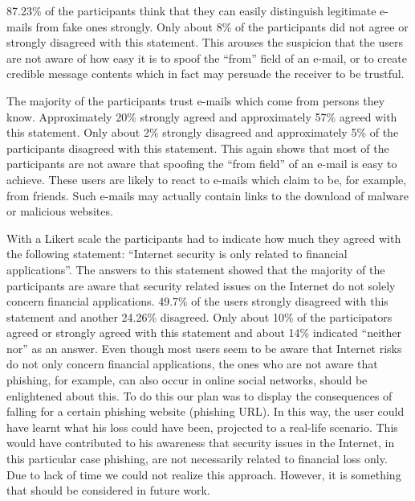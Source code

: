 \begin{description}[leftmargin=0cm]
	
	\item[Self-Assessment - Distinguish legitimate from illegitimate e-mails] 87.23\% of the participants think that they can easily distinguish legitimate e-mails from fake ones strongly.
 Only about 8\% of the participants did not agree or strongly disagreed with this statement.
 This arouses the suspicion that the users are not aware of how easy it is to spoof the ``from'' field of an e-mail, or to create credible message contents which in fact may persuade the receiver to be trustful.

	
	\item[Self-Assessment - Trust in e-mails from known parties] The majority of the participants trust e-mails which come from persons they know.
 Approximately 20\% strongly agreed and approximately 57\% agreed with this statement.
 Only about 2\% strongly disagreed and approximately 5\% of the participants disagreed with this statement.
 This again shows that most of the participants are not aware that spoofing the ``from field'' of an e-mail is easy to achieve.
 These users are likely to react to e-mails which claim to be, for example, from friends.
 Such e-mails may actually contain links to the download of malware or malicious websites.


	\item[Self-Assessment - Internet security is only related to financial applications] With a Likert scale the participants had to indicate how much they agreed with the following statement: ``Internet security is only related to financial applications''. The answers to this statement showed that the majority of the participants are aware that security related issues on the Internet do not solely concern financial applications.
 49.7\% of the users strongly disagreed with this statement and another 24.26\% disagreed.
 Only about 10\% of the participators agreed or strongly agreed with this statement and about 14\% indicated ``neither nor'' as an answer.
 Even though most users seem to be aware that Internet risks do not only concern financial applications, the ones who are not aware that phishing, for example, can also occur in online social networks, should be enlightened about this.
 To do this our plan was to display the consequences of falling for a certain phishing website (phishing URL). In this way, the user could have learnt what his loss could have been, projected to a real-life scenario.
 This would have contributed to his awareness that security issues in the Internet, in this particular case phishing, are not necessarily related to financial loss only.
 Due to lack of time we could not realize this approach. However, it is something that should be considered in future work.



\end{description}
